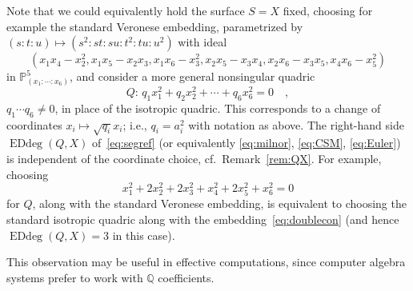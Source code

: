 \documentclass[11pt]{amsart}
\numberwithin{equation}{section}
\newcommand{\Pbb}{{\mathbb{P}}}
\newcommand{\Qbb}{{\mathbb{Q}}}
\DeclareMathOperator{\Edd}{EDdeg}
\begin{document}
Note that we could equivalently hold the surface $S=X$ fixed, choosing for
example the standard Veronese embedding, parametrized by 
$(s:t:u) \mapsto (s^2: st: su : t^2 : tu : u^2)$
with ideal
\[
(x_1 x_4 - x_2^2 , x_1 x_5 - x_2 x_3, x_1 x_6 - x_3^2,
x_2 x_5 - x_3 x_4, x_2 x_6 - x_3 x_5, x_4 x_6 - x_5^2)
\]
in $\Pbb^5_{(x_1:\cdots :x_6)}$, and consider a more general nonsingular quadric
\[
Q:\, q_1 x_1^2 + q_2 x_2^2 + \cdots + q_6 x_6^2 = 0\quad,
\]
$q_1\cdots q_6\ne 0$,
in place of the isotropic quadric. This corresponds to a change of coordinates
$x_i \mapsto \sqrt{q_i} x_i$; i.e., $q_i=a_i^2$ with notation as above.
The right-hand side $\Edd(Q,X)$ of~\eqref{eq:segref} (or equivalently 
\eqref{eq:milnor}, \eqref{eq:CSM}, \eqref{eq:Euler}) is independent
of the coordinate choice, cf.~Remark~\ref{rem:QX}. For example, choosing
\[
x_1^2+2 x_2^2+2 x_3^2+x_4^2+2 x_5^2+x_6^2 = 0
\]
for $Q$, along with the standard Veronese embedding, is equivalent to choosing
the standard isotropic quadric along with the embedding~\eqref{eq:doublecon}
(and hence $\Edd(Q,X)=3$ in this case).

This observation may be useful in effective computations, since computer algebra
systems prefer to work with $\Qbb$ coefficients.
\end{document}
